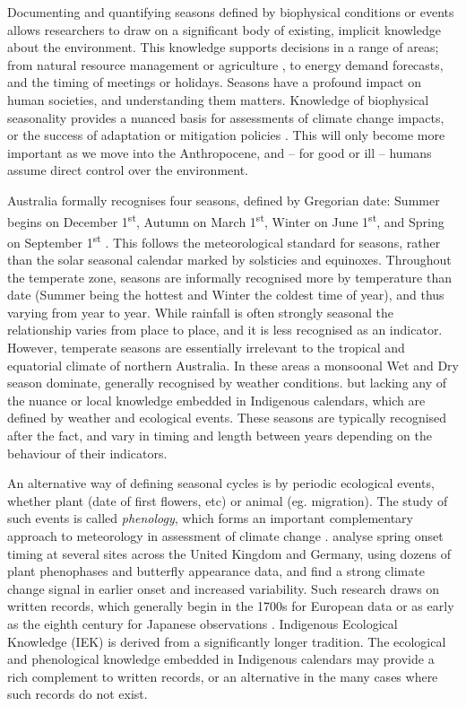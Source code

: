 Documenting and quantifying seasons defined by biophysical conditions
or events allows researchers to draw on a significant body of existing,
implicit knowledge about the environment.
%
This knowledge supports decisions in a range of areas; from natural
resource management or agriculture \citep{woodward2012a,ens2012}, to
energy demand forecasts, and the timing of meetings or holidays.
Seasons have a profound impact on human societies, and understanding
them matters.  Knowledge of biophysical seasonality provides a nuanced
basis for assessments of climate change impacts, or the success of
adaptation or mitigation policies \citep{green2010a,stevenson1996,prober2011}.  This will only become more important
as we move into the Anthropocene, and -- for good or ill -- humans assume
direct control over the environment.


Australia formally recognises four seasons, defined by Gregorian date:
Summer begins on December 1\textsuperscript{st}, Autumn on March
1\textsuperscript{st}, Winter on June 1\textsuperscript{st}, and Spring
on September 1\textsuperscript{st} \citep{wells2013}. This follows the
meteorological standard for seasons, rather
than the solar seasonal calendar marked by solsticies and equinoxes.
%
Throughout the temperate zone, seasons are informally recognised more by
temperature than date (Summer being the hottest and Winter the coldest time
of year), and thus varying from year to year.  While rainfall is often
strongly  seasonal the relationship varies from place to place, and it is
less recognised as an indicator.
%
However, temperate seasons are essentially irrelevant to the tropical and
equatorial climate of northern Australia.  In these areas a monsoonal Wet
and Dry season dominate, generally recognised by weather conditions.
but lacking any of the nuance or local knowledge embedded in Indigenous
calendars, which are defined by weather and ecological events.  These
seasons are typically recognised after the fact, and vary in timing and
length between years depending on the behaviour of their indicators.


An alternative way of defining seasonal cycles is by periodic ecological
events, whether plant (date of first flowers, etc) or animal (eg. migration).
The study of such events is called \textit{phenology}, which forms an
important complementary approach to meteorology in assessment of climate
change \citep[eg.][]{roy2000}.  \citet{menzel2006} analyse spring onset timing
at several sites across the United Kingdom and Germany, using dozens of
plant phenophases and butterfly appearance data, and find a strong climate
change signal in earlier onset and increased variability.  Such research
draws on written records, which generally begin in the 1700s for European
data or as early as the eighth century for Japanese observations \citep{sparks2002}.
%
Indigenous Ecological Knowledge (IEK) is derived from a significantly longer
tradition.  The ecological and phenological knowledge embedded
in Indigenous calendars may provide a rich complement to written records,
or an alternative in the many cases where such records do not exist.

